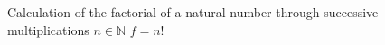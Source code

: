 \documentclass[a4paper, 11pt]{article}
\begin{document}
\begin{tcblisting}{}
    \begin{algorithmic}
        \Description Calculation of the factorial of a natural number through successive multiplications
        \Require $n \in \mathbb{N}$
        \Ensure $f = n!$
    \end{algorithmic}
\end{tcblisting}
%
%
%
%
%
%
%
%
%
%
%
%
\end{document}
